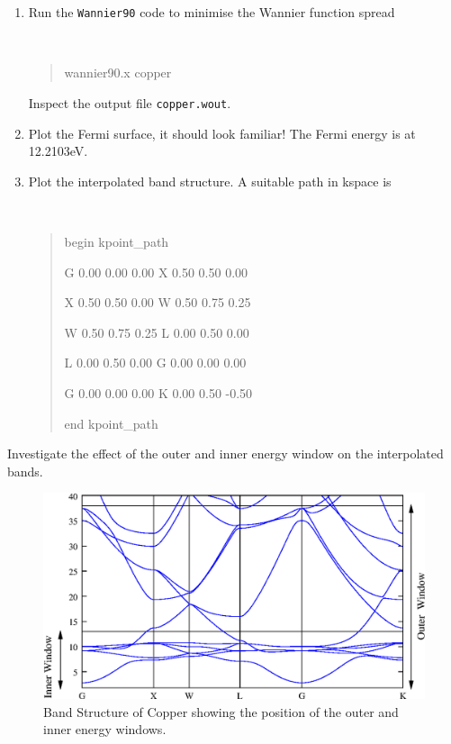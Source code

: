 \documentclass[a4paper,11pt,twoside]{article}
\begin{document}
\begin{enumerate}
\item Run the {\tt Wannier90} code to minimise the Wannier function spread
{\tt
\begin{quote}
wannier90.x copper
\end{quote} }
Inspect the output file {\tt copper.wout}. 

\item Plot the Fermi surface, it should look familiar! The Fermi energy is at 12.2103eV.

\item Plot the interpolated band structure. A suitable path in kspace is
\smallskip
{\tt
\begin{quote}
begin kpoint\_path

G 0.00  0.00  0.00    X 0.50  0.50  0.00

X 0.50  0.50  0.00    W 0.50  0.75  0.25

W 0.50  0.75  0.25    L 0.00  0.50  0.00

L 0.00  0.50  0.00    G 0.00  0.00  0.00

G 0.00  0.00  0.00    K 0.00  0.50 -0.50
 
end kpoint\_path
\end{quote} }
\end{enumerate}
Investigate the effect of the outer and inner energy window on the interpolated bands.



\begin{figure}[h]
\begin{center}
\includegraphics{cu.eps}
\caption{Band Structure of Copper showing the position of the outer and inner energy windows.}
\label{fig:cu-bnd}
\end{center}
\end{figure}
\end{document}
